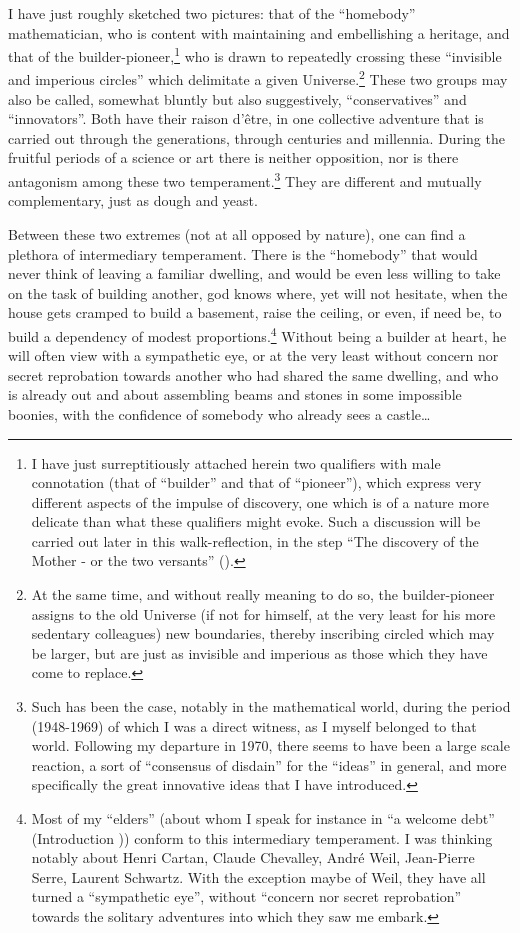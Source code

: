 I have just roughly sketched two pictures: that of the ``homebody'' mathematician, who
is content with maintaining and embellishing a heritage, and that of the
builder-pioneer,\footnote{I have just surreptitiously attached herein two qualifiers with 
male connotation (that of ``builder'' and that of ``pioneer''), which express very
different aspects of the impulse of discovery, one which is of a nature more delicate than
what these qualifiers might evoke. Such a discussion will be carried out later in this
walk-reflection, in the step ``The discovery of the Mother - or the two versants''
().}
who is drawn to repeatedly crossing these ``invisible and imperious circles'' which
delimitate a given Universe.\footnote{At the same time, and without really meaning to do
so, the builder-pioneer assigns to the old Universe (if not for himself, at the very least
for his more sedentary colleagues) new boundaries, thereby inscribing 
circled which may be larger, but are just as invisible and imperious as those which they
have come to replace.} These two groups
may also be called, somewhat bluntly but also suggestively, ``conservatives'' and
``innovators''. Both have their raison d'\^etre, in one collective adventure that is
carried out through the generations, through centuries and millennia.
During the fruitful periods of a science or art there is neither opposition, nor is there 
antagonism among these two temperament.\footnote{Such has been the case, notably in the
mathematical world, during the period (1948-1969) of which I was a direct witness, as I
myself belonged to that world. Following my departure in 1970, there seems to have been a
large scale reaction, a sort of ``consensus of disdain'' for the ``ideas'' in general, and
more specifically the great innovative ideas that I have introduced.} 
They are different and mutually complementary,
just as dough and yeast. 

Between these two extremes (not at all opposed by nature), one can find a plethora of
intermediary temperament. There is the ``homebody'' that would never think of leaving a
familiar dwelling, and would be even less willing to take on the task of building another,
god knows where, yet will not hesitate, when the house gets cramped to build a basement,
raise the ceiling, or even, if need be, to build a dependency of modest
proportions.\footnote{Most of my ``elders'' (about whom I speak for instance in ``a
welcome debt'' (Introduction )) conform to this intermediary temperament. I was
thinking notably about Henri Cartan, Claude Chevalley, Andr\'e Weil, Jean-Pierre Serre,
Laurent Schwartz. With the exception maybe of Weil, they have all turned a ``sympathetic
eye'', without ``concern nor secret reprobation'' towards
the solitary adventures into which they saw me embark.} Without being a builder at heart,
he will often view with a sympathetic eye, or at the very least without concern nor secret
reprobation towards another who had shared the same dwelling, and who is already out and
about assembling beams 
and stones in some impossible boonies, with the confidence of somebody
who already sees a castle\ldots 

